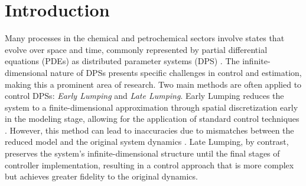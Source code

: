 \section{Introduction}

Many processes in the chemical and petrochemical sectors involve states that evolve over space and time, commonly represented by partial differential equations (PDEs) as distributed parameter systems (DPS) \cite{ray1981advanced}. 
The infinite-dimensional nature of DPSs presents specific challenges in control and estimation, making this a prominent area of research. Two main methods are often applied to control DPSs: \textit{Early Lumping} and \textit{Late Lumping}. 
Early Lumping reduces the system to a finite-dimensional approximation through spatial discretization early in the modeling stage, allowing for the application of standard control techniques \cite{davison1976robust}. 
However, this method can lead to inaccuracies due to mismatches between the reduced model and the original system dynamics \cite{moghadam2012infinite}. 
Late Lumping, by contrast, preserves the system's infinite-dimensional structure until the final stages of controller implementation, resulting in a control approach that is more complex but achieves greater fidelity to the original dynamics.

